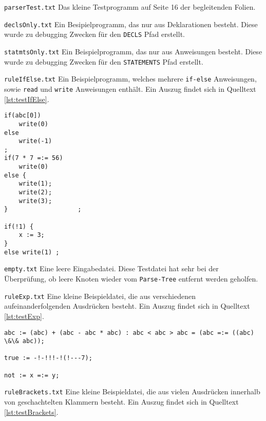 \documentclass[
a4paper,   %
11pt,      %
oneside,   %
onecolumn, %
final      %
]{article}
\newcommand{\code}[1]{\lstinline$#1$}
\begin{document}
\begin{description}
\item{\texttt{parserTest.txt}} Das kleine Testprogramm auf Seite 16 der begleitenden Folien.

\item{\texttt{declsOnly.txt}} Ein Besipielprogramm, das nur aus Deklarationen besteht. Diese wurde zu debugging Zwecken für den \code{DECLS} Pfad erstellt.

\item{\texttt{statmtsOnly.txt}} Ein Beispielprogramm, das nur aus Anweisungen besteht. Diese wurde zu debugging Zwecken für den \code{STATEMENTS} Pfad erstellt.

\item{\texttt{ruleIfElse.txt}} Ein Beispielprogramm, welches mehrere \code{if-else} Anweisungen, sowie \code{read} und \code{write} Anweisungen enthält. Ein Auszug findet sich in Quelltext \ref{lst:testIfElse}.

\begin{lstlisting}[language=SysProgLang, caption={ruleIfElse.txt}, label=lst:testIfElse]
if(abc[0])
    write(0)
else
    write(-1)
;
if(7 * 7 =:= 56)
    write(0)
else {
    write(1);
    write(2);
    write(3);
}                   ;

if(!1) {
    x := 3;
}
else write(1) ;
\end{lstlisting}

\item{\texttt{empty.txt}} Eine leere Eingabedatei. Diese Testdatei hat sehr bei der Überprüfung, ob leere Knoten wieder vom \code{Parse-Tree} entfernt werden geholfen.

\item{\texttt{ruleExp.txt}} Eine kleine Beispieldatei, die aus verschiedenen aufeinanderfolgenden Ausdrücken besteht. Ein Auszug findet sich in Quelltext \ref{lst:testExp}.

\begin{lstlisting}[language=SysProgLang, caption={ruleExp.txt}, label=lst:testExp]
abc := (abc) + (abc - abc * abc) : abc < abc > abc = (abc =:= ((abc) \&\& abc));

true := -!-!!!-!(!---7);

not := x =:= y;
\end{lstlisting}

\item{\texttt{ruleBrackets.txt}} Eine kleine Beispieldatei, die aus vielen Ausdrücken innerhalb von geschachtelten Klammern besteht. Ein Auszug findet sich in Quelltext \ref{lst:testBrackets}.


\end{description}
\end{document}
